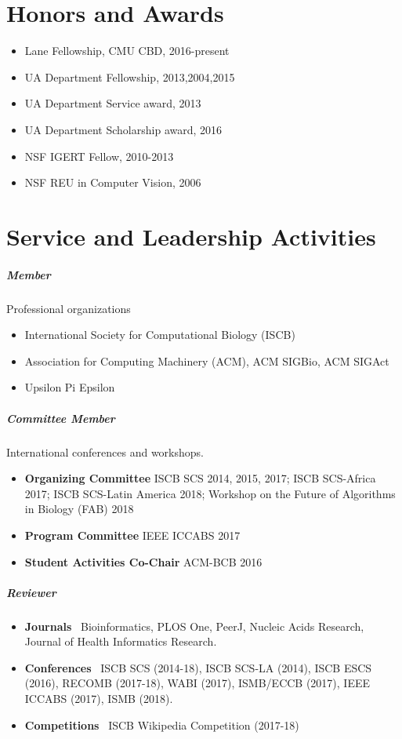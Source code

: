 \documentclass[10pt,letterpaper]{article}
\begin{document}
\section*{Honors and Awards}

\begin{itemize}
    \item Lane Fellowship, CMU CBD, 2016-present
    \item UA Department Fellowship, 2013,2004,2015
    \item UA Department Service award, 2013
    \item UA Department Scholarship award, 2016
    \item NSF IGERT Fellow, 2010-2013
    \item NSF REU in Computer Vision, 2006
\end{itemize}


\section*{Service and Leadership Activities}


\subparagraph{Member} Professional organizations
\begin{itemize}
\item International Society for Computational Biology (ISCB)
\item Association for Computing Machinery (ACM), ACM SIGBio, ACM SIGAct
\item Upsilon Pi Epsilon
\end{itemize}

\subparagraph{Committee Member} International conferences and workshops.
\begin{itemize}[leftmargin=!,labelindent=5pt,itemindent=-15pt]
    \item \textbf{Organizing Committee} ISCB SCS 2014, 2015, 2017; 
    ISCB SCS-Africa 2017;
    ISCB SCS-Latin America 2018;  
    Workshop on the Future of Algorithms in Biology (FAB) 2018
    \item \textbf{Program Committee} IEEE ICCABS 2017
    \item \textbf{Student Activities Co-Chair} ACM-BCB 2016
\end{itemize}

\subparagraph{Reviewer} 
\begin{itemize}[leftmargin=!,labelindent=5pt,itemindent=-15pt]
    \item \textbf{Journals} \ 
        Bioinformatics,
        PLOS One, 
        PeerJ, 
        Nucleic Acids Research,
        Journal of Health Informatics Research. 
    \item \textbf{Conferences} \ 
        ISCB SCS (2014-18), %
        ISCB SCS-LA (2014), %
        ISCB ESCS (2016), %
	RECOMB (2017-18), %
	WABI (2017), %
	ISMB/ECCB (2017), %
    	IEEE ICCABS (2017), %
	ISMB (2018). %
     \item \textbf{Competitions} \
     	ISCB Wikipedia Competition (2017-18)
\end{itemize}
\end{document}
